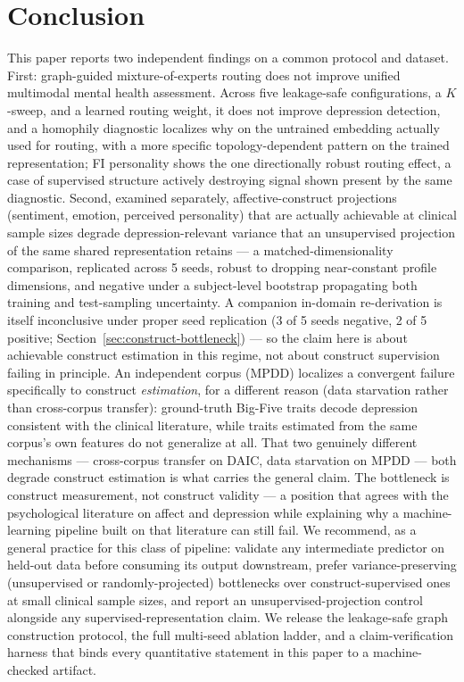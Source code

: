 \documentclass[twocolumn]{article}
\begin{document}
\section{Conclusion}
\label{sec:conclusion}

This paper reports two independent findings on a common protocol and dataset. First: graph-guided mixture-of-experts routing does not improve unified multimodal mental health assessment. Across five leakage-safe configurations, a $K$-sweep, and a learned routing weight, it does not improve depression detection, and a homophily diagnostic localizes why on the untrained embedding actually used for routing, with a more specific topology-dependent pattern on the trained representation; FI personality shows the one directionally robust routing effect, a case of supervised structure actively destroying signal shown present by the same diagnostic. Second, examined separately, affective-construct projections (sentiment, emotion, perceived personality) that are actually achievable at clinical sample sizes degrade depression-relevant variance that an unsupervised projection of the same shared representation retains — a matched-dimensionality comparison, replicated across 5 seeds, robust to dropping near-constant profile dimensions, and negative under a subject-level bootstrap propagating both training and test-sampling uncertainty. A companion in-domain re-derivation is itself inconclusive under proper seed replication (3 of 5 seeds negative, 2 of 5 positive; Section~\ref{sec:construct-bottleneck}) — so the claim here is about achievable construct estimation in this regime, not about construct supervision failing in principle. An independent corpus (MPDD) localizes a convergent failure specifically to construct \emph{estimation}, for a different reason (data starvation rather than cross-corpus transfer): ground-truth Big-Five traits decode depression consistent with the clinical literature, while traits estimated from the same corpus's own features do not generalize at all. That two genuinely different mechanisms — cross-corpus transfer on DAIC, data starvation on MPDD — both degrade construct estimation is what carries the general claim. The bottleneck is construct measurement, not construct validity — a position that agrees with the psychological literature on affect and depression while explaining why a machine-learning pipeline built on that literature can still fail. We recommend, as a general practice for this class of pipeline: validate any intermediate predictor on held-out data before consuming its output downstream, prefer variance-preserving (unsupervised or randomly-projected) bottlenecks over construct-supervised ones at small clinical sample sizes, and report an unsupervised-projection control alongside any supervised-representation claim. We release the leakage-safe graph construction protocol, the full multi-seed ablation ladder, and a claim-verification harness that binds every quantitative statement in this paper to a machine-checked artifact.
\end{document}

